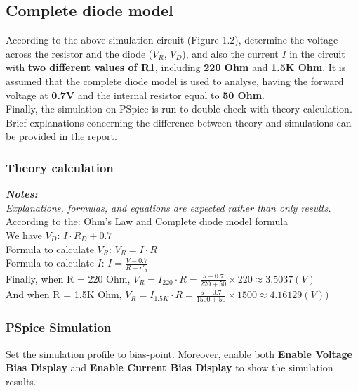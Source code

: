\subsection{Complete diode model}
According to the above simulation circuit (Figure 1.2), determine the voltage across the resistor and the diode ($V_{R}$, $V_{D}$), and also the current $I$ in the circuit with \textbf{two different values of R1}, including \textbf{220 Ohm} and \textbf{1.5K Ohm}. It is assumed that the complete diode model is used to analyse, having the forward voltage at \textbf{0.7V} and the internal resistor equal to \textbf{50 Ohm}.\\

Finally, the simulation on PSpice is run to double check with theory calculation. Brief explanations concerning the difference between theory and simulations can be provided in the report.\\

\subsubsection{Theory calculation}
\textit{\textbf{Notes:}}\\
\textit{Explanations, formulas, and equations are expected rather than only results.}\\

According to the: Ohm's Law and Complete diode model formula\bigskip\\
We have $V_{D}$: $I \cdot R_D + 0.7$\bigskip\\
Formula to calculate $V_{R}$: $ V_R = I \cdot R $\bigskip\\
Formula to calculate $I$: $I = \frac{V - 0.7}{R + r'_d}$\bigskip\\
Finally, when R = 220 Ohm, $V_{R} = I_{220} \cdot R = \frac{5-0.7}{220 + 50} \times 220 \approx 3.5037 (V)$ \bigskip\\
And when R = 1.5K Ohm, $V_{R} = I_{1.5K}\cdot R =\frac{5-0.7}{1500+50} \times 1500 \approx 4.16129 (V)) $ \bigskip\\


\subsubsection{PSpice Simulation}
Set the simulation profile to bias-point. Moreover, enable both \textbf{Enable Voltage Bias Display} and \textbf{Enable Current Bias Display} to show the simulation results. \\

